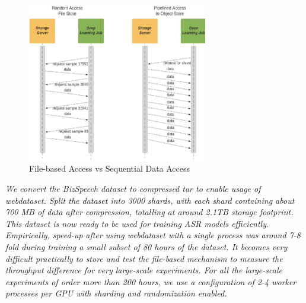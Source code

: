 \begin{figure}[ht]
  \begin{center}
    \includegraphics[width=0.7\textwidth]{images/sequential.png} 
    \caption{File-based Access vs Sequential Data Access \cite{Aizman2019HighLearning}}
    \label{fig:seq}
  \end{center}
\end{figure}

\emph{We convert the BizSpeech dataset  to compressed tar to enable usage of webdataset. Split the dataset into 3000 shards, with each shard containing about 700 MB of data after compression, totalling at around 2.1TB storage footprint. This dataset is now ready to be used for training ASR models efficiently. Empirically, speed-up after using webdataset with a single process was around 7-8 fold during training a small subset of 80 hours of the dataset. It becomes very difficult practically to store and test the file-based mechanism to measure the throughput difference for very large-scale experiments. For all the large-scale experiments of order more than 200 hours, we use a configuration of 2-4 worker processes per GPU with sharding and randomization enabled.}

